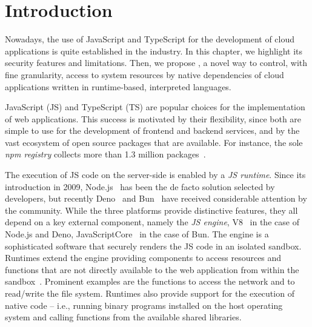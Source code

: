 \section{Introduction}
\label{sect:introduction}

Nowadays, the use of JavaScript and TypeScript for the development of
cloud applications is quite established in the industry. In this
chapter, we highlight its security features and limitations. Then, we
propose \natisand, a novel way to control, with fine granularity,
access to system resources by native dependencies of cloud
applications written in runtime-based, interpreted languages.


JavaScript (JS) and TypeScript (TS) are popular choices for the
implementation of web applications. This success is motivated by their
flexibility, since both are simple to use for the development of
frontend and backend services, and by the vast ecosystem of open
source packages that are available. For instance, the sole {\em npm
  registry} collects more than 1.3 million
packages~\cite{npm-registry}.

The execution of JS code on the server-side is enabled by a {\em JS
  runtime}.  Since its introduction in 2009, Node.js~\cite{node} has
been the de facto solution selected by developers, but recently
Deno~\cite{deno} and Bun~\cite{bun} have received considerable
attention by the community. While the three platforms provide
distinctive features, they all depend on a key external component,
namely the {\em JS engine}, V8~\cite{v8-site} in the
case of Node.js and Deno, JavaScriptCore~\cite{javascriptcore} in the
case of Bun. The engine is a sophisticated software that securely
renders the JS code in an isolated sandbox. Runtimes extend the engine
providing components to access resources and functions that are not
directly available to the web application from within the
sandbox~\cite{node-api, deno-api}. Prominent examples are the
functions to access the network and to read/write the
file system. Runtimes also provide support for the execution of native
code -- i.e., running binary programs installed on the host operating
system and calling functions from the available shared libraries.

